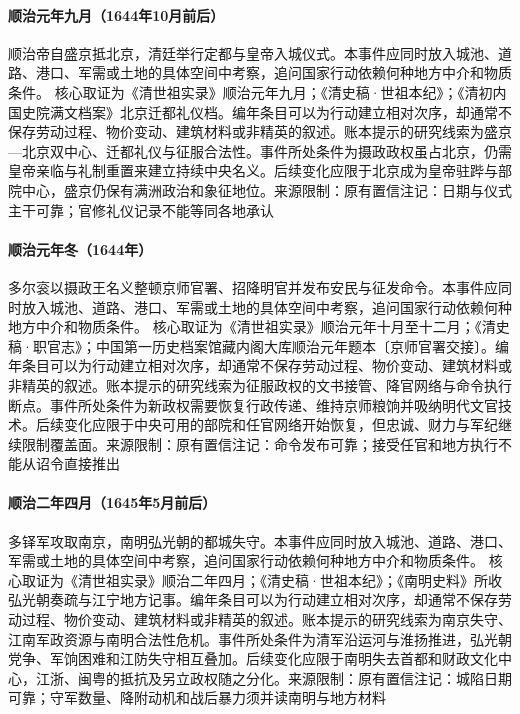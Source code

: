 \hypertarget{civic:EQ-1644-SHUNZHI-BEIJING}{}\paragraph{顺治元年九月（1644年10月前后）}顺治帝自盛京抵北京，清廷举行定都与皇帝入城仪式。本事件应同时放入城池、道路、港口、军需或土地的具体空间中考察，追问国家行动依赖何种地方中介和物质条件。 核心取证为《清世祖实录》顺治元年九月；《清史稿·世祖本纪》；《清初内国史院满文档案》北京迁都礼仪档。编年条目可以为行动建立相对次序，却通常不保存劳动过程、物价变动、建筑材料或非精英的叙述。账本提示的研究线索为盛京—北京双中心、迁都礼仪与征服合法性。事件所处条件为摄政政权虽占北京，仍需皇帝亲临与礼制重置来建立持续中央名义。后续变化应限于北京成为皇帝驻跸与部院中心，盛京仍保有满洲政治和象征地位。来源限制：原有置信注记：日期与仪式主干可靠；官修礼仪记录不能等同各地承认
\hypertarget{civic:EQ-1644-REGENT-ORDERS}{}\paragraph{顺治元年冬（1644年）}多尔衮以摄政王名义整顿京师官署、招降明官并发布安民与征发命令。本事件应同时放入城池、道路、港口、军需或土地的具体空间中考察，追问国家行动依赖何种地方中介和物质条件。 核心取证为《清世祖实录》顺治元年十月至十二月；《清史稿·职官志》；中国第一历史档案馆藏内阁大库顺治元年题本〔京师官署交接〕。编年条目可以为行动建立相对次序，却通常不保存劳动过程、物价变动、建筑材料或非精英的叙述。账本提示的研究线索为征服政权的文书接管、降官网络与命令执行断点。事件所处条件为新政权需要恢复行政传递、维持京师粮饷并吸纳明代文官技术。后续变化应限于中央可用的部院和任官网络开始恢复，但忠诚、财力与军纪继续限制覆盖面。来源限制：原有置信注记：命令发布可靠；接受任官和地方执行不能从诏令直接推出
\hypertarget{civic:EQ-1645-NANJING-TAKEN}{}\paragraph{顺治二年四月（1645年5月前后）}多铎军攻取南京，南明弘光朝的都城失守。本事件应同时放入城池、道路、港口、军需或土地的具体空间中考察，追问国家行动依赖何种地方中介和物质条件。 核心取证为《清世祖实录》顺治二年四月；《清史稿·世祖本纪》；《南明史料》所收弘光朝奏疏与江宁地方记事。编年条目可以为行动建立相对次序，却通常不保存劳动过程、物价变动、建筑材料或非精英的叙述。账本提示的研究线索为南京失守、江南军政资源与南明合法性危机。事件所处条件为清军沿运河与淮扬推进，弘光朝党争、军饷困难和江防失守相互叠加。后续变化应限于南明失去首都和财政文化中心，江浙、闽粤的抵抗及另立政权随之分化。来源限制：原有置信注记：城陷日期可靠；守军数量、降附动机和战后暴力须并读南明与地方材料
